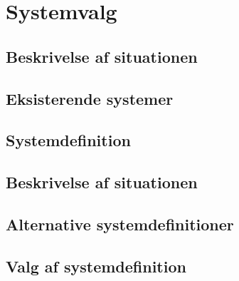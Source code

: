 \chapter{Systemvalg}
\section{Beskrivelse af situationen}
\section{Eksisterende systemer}
\section{Systemdefinition}
\section{Beskrivelse af situationen}
\section{Alternative systemdefinitioner}
\section{Valg af systemdefinition}
